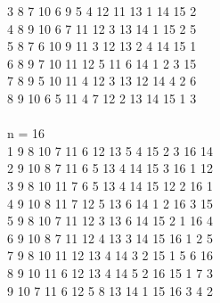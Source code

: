 {3 8 7 10 6 9 5 4 12 11 13 1 14 15 2\\
4 8 9 10 6 7 11 12 3 13 14 1 15 2 5\\
5 8 7 6 10 9 11 3 12 13 2 4 14 15 1\\
6 8 9 7 10 11 12 5 11 6 14 1 2 3 15 \\
7 8 9 5 10 11 4 12 3 13 12 14 4 2 6\\
8 9 10 6 5 11 4 7 12 2 13 14 15 1 3\\
\\
n = 16\\
1 9 8 10 7 11 6 12 13 5 4 15 2 3 16 14\\
2 9 10 8 7 11 6 5 13 4 14 15 3 16 1 12\\
3 9 8 10 11 7 6 5 13 4 14 15 12 2 16 1\\
4 9 10 8 11 7 12 5 13 6 14 1 2 16 3 15\\
5 9 8 10 7 11 12 3 13 6 14 15 2 1 16 4\\
6 9 10 8 7 11 12 4 13 3 14 15 16 1 2 5\\
7 9 8 10 11 12 13 4 14 3 2 15 1 5 6 16 \\
8 9 10 11 6 12 13 4 14 5 2 16 15 1 7 3\\
9 10 7 11 6 12 5 8 13 14 1 15 16 3 4 2\\
}
